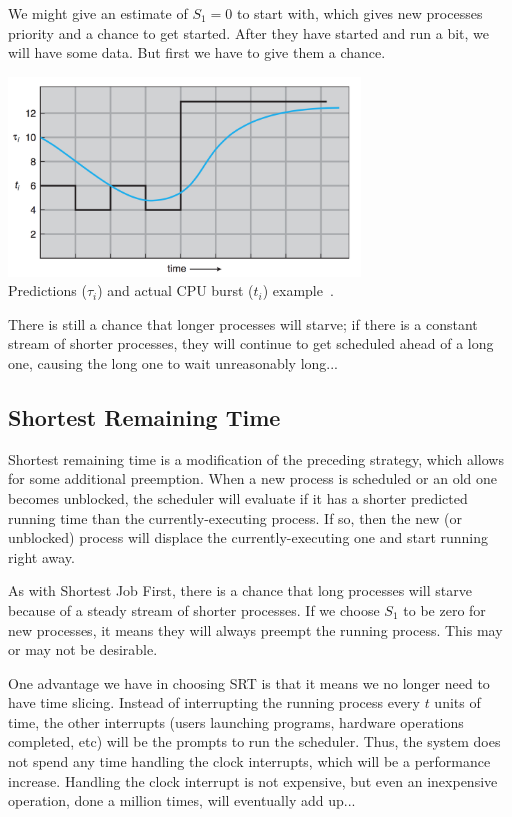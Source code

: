 We might give an estimate of $S_{1} = 0$ to start with, which gives new processes priority and a chance to get started. After they have started and run a bit, we will have some data. But first we have to give them a chance.

\begin{center}
\includegraphics[width=0.7\textwidth]{images/sjf-2.png}\\
Predictions ($\tau_{i}$) and actual CPU burst ($t_{i}$) example~\cite{osc}.
\end{center}

There is still a chance that longer processes will starve; if there is a constant stream of shorter processes, they will continue to get scheduled ahead of a long one, causing the long one to wait unreasonably long...

\subsection*{Shortest Remaining Time}

Shortest remaining time is a modification of the preceding strategy, which allows for some additional preemption. When a new process is scheduled or an old one becomes unblocked, the scheduler will evaluate if it has a shorter predicted running time than the currently-executing process. If so, then the new (or unblocked) process will displace the currently-executing one and start running right away.

As with Shortest Job First, there is a chance that long processes will starve because of a steady stream of shorter processes. If we choose $S_{1}$ to be zero for new processes, it means they will always preempt the running process. This may or may not be desirable.

One advantage we have in choosing SRT is that it means we no longer need to have time slicing. Instead of interrupting the running process every $t$ units of time, the other interrupts (users launching programs, hardware operations completed, etc) will be the prompts to run the scheduler. Thus, the system does not spend any time handling the clock interrupts, which will be a performance increase. Handling the clock interrupt is not expensive, but even an inexpensive operation, done a million times, will eventually add up...~\cite{osi}

